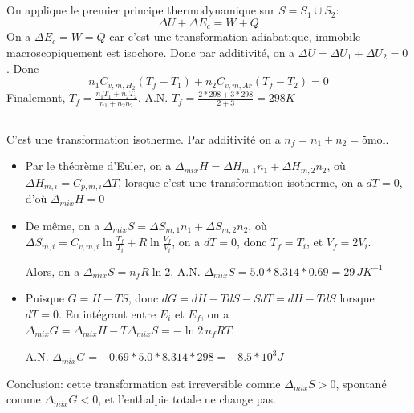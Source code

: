 \documentclass[a4paper,12pt]{book}
\begin{document}
\subsection{}
On applique le premier principe thermodynamique sur $S=S_1\cup S_2$: 
$$
\Delta U+\Delta E_c=W+Q
$$ 
On a $\Delta E_c=W=Q$ car c'est une transformation adiabatique, immobile macroscopiquement est isochore. 
Donc par additivité, on a $\Delta U=\Delta U_1+\Delta U_2=0$. Donc $$n_1C_{v,m,H_2}(T_f-T_1)+n_2C_{v,m,Ar}(T_f-T_2)=0$$
Finalemant, $\boxed{T_f=\frac{n_1T_1+n_2T_2}{n_1+n_2n_2}}$. A.N. $\boxed{T_f=\frac{2*298+3*298}{2+3}=298K}$
\subsection{}
C'est une transformation isotherme. Par additivité on a $n_f=n_1+n_2=5$mol.  
\begin{itemize}
    \item Par le théorème d'Euler, on a $\Delta_{mix}H=\Delta H_{m,1}n_1+\Delta H_{m,2}n_2$, où 
    $\Delta H_{m,i}=C_{p,m,i}\Delta T$, lorsque c'est une transformation isotherme, on a $dT=0$, d'où $\boxed{\Delta_{mix}H=0}$
    \item De même, on a $\Delta_{mix}S=\Delta S_{m,1}n_1+\Delta S_{m,2}n_2$, où 
    $\Delta S_{m,i}=C_{v,m,i}\ln\frac{T_f}{T_i}+R\ln\frac{V_f}{V_i}$, on a $dT=0$, donc $T_f=T_i$, et $V_f=2V_i$. 
    
    Alors, on a $\boxed{\Delta_{mix}S=n_fR\ln2}$. A.N. $\boxed{\Delta_{mix}S=5.0*8.314*0.69=29\,JK^{-1}}$
    \item Puisque $G=H-TS$, donc $dG=dH-TdS-SdT=dH-TdS$ lorsque $dT=0$. En intégrant entre $E_i$ et $E_f$, on a 
    $\boxed{\Delta_{mix}G=\Delta_{mix}H-T\Delta_{mix}S=-\ln{2}\,n_fRT}$. 
    
    A.N. $\boxed{\Delta_{mix}G=-0.69*5.0*8.314*298=-8.5*10^3J}$
\end{itemize}
Conclusion: cette transformation est irreversible comme $\Delta_{mix}S>0$, spontané comme $\Delta_{mix}G<0$, et l'enthalpie totale ne change pas. 
\end{document}
